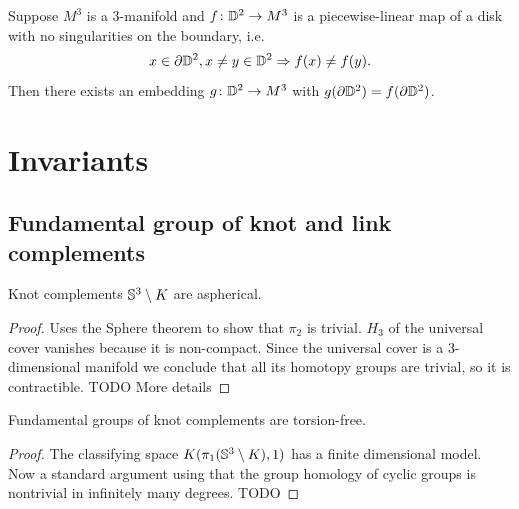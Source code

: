 \begin{lemma} 
	Suppose $M^{3}$ is a $3$-manifold and $f \colon \mathbb{D}^{2} \rightarrow M^{3}$
	is a piecewise-linear map of a disk with no singularities on the boundary, i.e.
	\[
		x \in \partial \mathbb{D}^{2}, x \ne y \in \mathbb{D}^{2} \Rightarrow f(x) \ne f(y).
	\]
	Then there exists an embedding $g \colon \mathbb{D}^{2} \rightarrow M^{3}$
	with $g(\partial \mathbb{D}^{2}) = f(\partial \mathbb{D}^{2})$.
\end{lemma}

\section{Invariants}

\subsection{Fundamental group of knot and link complements}

\begin{proposition}
	Knot complements $\mathbb{S}^{3} \setminus K$
	are aspherical.
\end{proposition}
\begin{proof}
	Uses the Sphere theorem to show that $\pi_{2}$ is trivial.
	$H_{3}$ of the universal cover vanishes because it is non-compact.
	Since the universal cover is a $3$-dimensional manifold we conclude that
	all its homotopy groups are trivial, so it is contractible.
	TODO More details
\end{proof}

\begin{corollary}
	Fundamental groups of knot complements are torsion-free.
\end{corollary}

\begin{proof}
	The classifying space $K(\pi_1(\mathbb{S}^{3} \setminus K), 1)$
	has a finite dimensional model.
	Now a standard argument using that the group homology of
	cyclic groups is nontrivial in infinitely many degrees.
	TODO
\end{proof}

